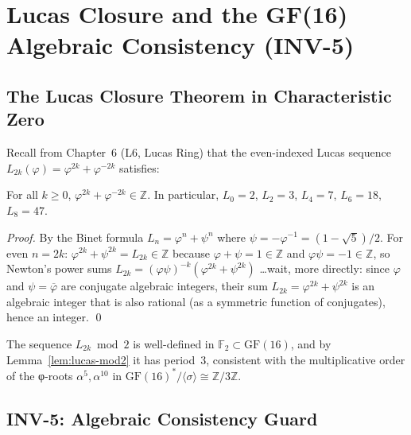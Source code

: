 \section{Lucas Closure and the GF(16) Algebraic Consistency (INV-5)}
\label{sec:gf16-lucas-closure}

\subsection{The Lucas Closure Theorem in Characteristic Zero}

Recall from Chapter~6 (L6, Lucas Ring) that the even-indexed Lucas sequence
\(L_{2k}(\varphi) = \varphi^{2k}+\varphi^{-2k}\) satisfies:

\begin{theorem}
\label{thm:lucas-closure-Z}
For all \(k\geq 0\), \(\varphi^{2k}+\varphi^{-2k}\in\mathbb{Z}\).
In particular, \(L_0=2\), \(L_2=3\), \(L_4=7\), \(L_6=18\), \(L_8=47\).
\end{theorem}

\begin{proof}
By the Binet formula \(L_n = \varphi^n + \psi^n\) where
\(\psi = -\varphi^{-1} = (1-\sqrt{5})/2\).
For even \(n=2k\): \(\varphi^{2k}+\psi^{2k}=L_{2k}\in\mathbb{Z}\)
because \(\varphi+\psi=1\in\mathbb{Z}\) and
\(\varphi\psi=-1\in\mathbb{Z}\), so Newton's power sums
\(L_{2k} = (\varphi\psi)^{-k}(\varphi^{2k}+\psi^{2k})\)
\ldots wait, more directly: since \(\varphi\) and \(\psi=\overline\varphi\)
are conjugate algebraic integers, their sum
\(L_{2k}=\varphi^{2k}+\psi^{2k}\) is an algebraic integer that is also
rational (as a symmetric function of conjugates), hence an integer.
\qed
\end{proof}

\begin{corollary}
\label{cor:lucas-closure-gf16}
The sequence \(L_{2k}\bmod 2\) is well-defined in \(\mathbb{F}_2\subset\mathrm{GF}(16)\),
and by Lemma~\ref{lem:lucas-mod2} it has period~3, consistent with the
multiplicative order of the φ-roots \(\alpha^5,\alpha^{10}\) in
\(\mathrm{GF}(16)^*/\langle\sigma\rangle\cong\mathbb{Z}/3\mathbb{Z}\).
\end{corollary}

\subsection{INV-5: Algebraic Consistency Guard}

